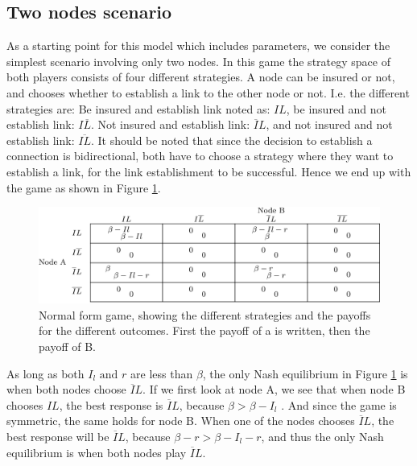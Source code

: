 \subsection{Two nodes scenario}
As a starting point for this model which includes parameters, we consider the simplest scenario involving only two nodes. In this game the strategy space of both players consists of four different strategies. A node can be insured or not, and chooses whether to establish a link to the other node or not. I.e. the different strategies are: Be insured and establish link noted as: $IL$, 
be insured and not establish link: $I\overline{L}$. Not insured and establish link: $\overline{I}L$, and not insured and not establish link: $\overline{IL}$. It should be noted that since the decision to establish a connection is bidirectional, both have to choose a strategy where they want to establish a link, for the link establishment to be successful. Hence we end up with the game as shown in Figure \ref{fig:FirstGameTheoryModel}.

\begin{figure} 
\centering
\includegraphics[width=1.0\textwidth]{../Figures/FirstGameWithParameters.png}
\caption[Normal form game, showing the different strategies and the payoffs for the different outcomes.]{\label{fig:FirstGameTheoryModel} Normal form game, showing the different strategies and the payoffs for the different outcomes. First the payoff of a is written, then the payoff of B.}
\end{figure}

As long as both $I_{l} \text{ and } r$ are less than $\beta$, the only Nash equilibrium in Figure \ref{fig:FirstGameTheoryModel} is when both nodes choose $\overline{I}L$. If we first look at node A, we see that when node B chooses $IL$, the best response is $\overline{I}L$, because $ \beta >\beta- I_{l}$ . And since the game is symmetric, the same holds for node B. 
When one of the nodes chooses $\overline{I}L$, the best response will be $\overline{I}L$, because $\beta - r>\beta - I_{l} - r  $, and thus the only Nash equilibrium is when both nodes play $\overline{I}L$.


